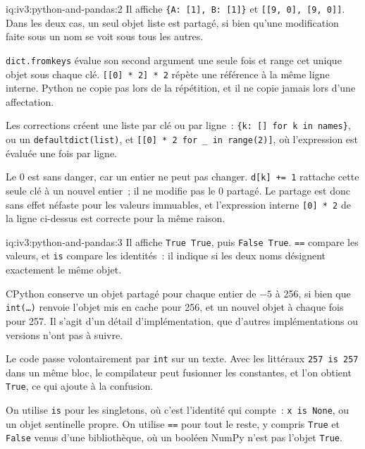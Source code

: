 \begin{solution}{iq:iv3:python-and-pandas:2}
Il affiche \texttt{\{\textquotesingle A\textquotesingle: [1], \textquotesingle B\textquotesingle: [1]\}} et \texttt{[[9, 0], [9, 0]]}. Dans les deux cas, un seul objet liste est partagé, si bien qu'une modification faite sous un nom se voit sous tous les autres.

\texttt{dict.fromkeys} évalue son second argument une seule fois et range cet unique objet sous chaque clé. \texttt{[[0] * 2] * 2} répète une référence à la même ligne interne. Python ne copie pas lors de la répétition, et il ne copie jamais lors d'une affectation.

Les corrections créent une liste par clé ou par ligne~: \texttt{\{k: [] for k in names\}}, ou un \texttt{defaultdict(list)}, et \texttt{[[0] * 2 for \_ in range(2)]}, où l'expression est évaluée une fois par ligne.

Le 0 est sans danger, car un entier ne peut pas changer. \texttt{d[k] += 1} rattache cette seule clé à un nouvel entier~; il ne modifie pas le 0 partagé. Le partage est donc sans effet néfaste pour les valeurs immuables, et l'expression interne \texttt{[0] * 2} de la ligne ci-dessus est correcte pour la même raison.

\end{solution}

\begin{solution}{iq:iv3:python-and-pandas:3}
Il affiche \texttt{True True}, puis \texttt{False True}. \texttt{==} compare les valeurs, et \texttt{is} compare les identités~: il indique si les deux noms désignent exactement le même objet.

CPython conserve un objet partagé pour chaque entier de $-5$ à 256, si bien que \texttt{int(\dots)} renvoie l'objet mis en cache pour 256, et un nouvel objet à chaque fois pour 257. Il s'agit d'un détail d'implémentation, que d'autres implémentations ou versions n'ont pas à suivre.

Le code passe volontairement par \texttt{int} sur un texte. Avec les littéraux \texttt{257 is 257} dans un même bloc, le compilateur peut fusionner les constantes, et l'on obtient \texttt{True}, ce qui ajoute à la confusion.

On utilise \texttt{is} pour les singletons, où c'est l'identité qui compte~: \texttt{x is None}, ou un objet sentinelle propre. On utilise \texttt{==} pour tout le reste, y compris \texttt{True} et \texttt{False} venus d'une bibliothèque, où un booléen NumPy n'est pas l'objet \texttt{True}.

\end{solution}

